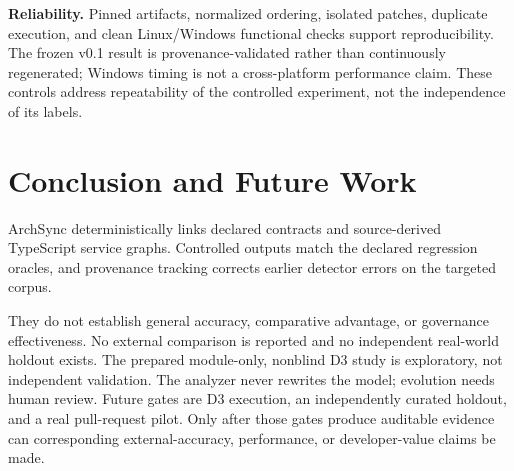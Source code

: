 \documentclass[conference]{IEEEtran}
\begin{document}
\textbf{Reliability.} Pinned artifacts, normalized ordering, isolated patches, duplicate execution, and clean Linux/Windows functional checks support reproducibility. The frozen v0.1 result is provenance-validated rather than continuously regenerated; Windows timing is not a cross-platform performance claim. These controls address repeatability of the controlled experiment, not the independence of its labels.

\section{Conclusion and Future Work}

ArchSync deterministically links declared contracts and source-derived TypeScript service graphs. Controlled outputs match the declared regression oracles, and provenance tracking corrects earlier detector errors on the targeted corpus.

They do not establish general accuracy, comparative advantage, or governance effectiveness. No external comparison is reported and no independent real-world holdout exists. The prepared module-only, nonblind D3 study is exploratory, not independent validation. The analyzer never rewrites the model; evolution needs human review. Future gates are D3 execution, an independently curated holdout, and a real pull-request pilot. Only after those gates produce auditable evidence can corresponding external-accuracy, performance, or developer-value claims be made.





\end{document}
